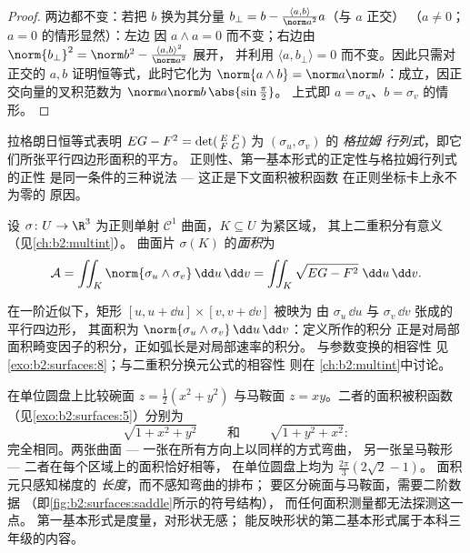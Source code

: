 \begin{proof}
两边都不变：若把 $b$ 换为其分量 $b_\perp
= b - \frac{\langle a, b\rangle}{\norm a^2}a$（与 $a$ 正交）
（$a \neq 0$；$a = 0$ 的情形显然）：左边
因 $a \wedge a = 0$ 而不变；右边由 $\norm
{b_\perp}^2 = \norm b^2 - \frac{\langle a,b\rangle^2}{\norm a^2}$ 展开，
并利用 $\langle a, b_\perp\rangle = 0$ 而不变。因此只需对正交的
$a, b$ 证明恒等式，此时它化为 $\norm{a \wedge
b} = \norm a \norm b$：成立，因正交向量的叉积范数为
$\norm a\norm b\,\abs{\sin\frac\pi2}$。
上式即 $a = \sigma_u$、$b = \sigma_v$ 的情形。
\end{proof}

\begin{remark}
拉格朗日恒等式表明 $EG - F^2 = \det\begin{psmallmatrix}
E & F\\ F & G\end{psmallmatrix}$ 为 $(\sigma_u, \sigma_v)$ 的 \emph{格拉姆
行列式}，即它们所张平行四边形面积的平方。
正则性、第一基本形式的正定性与格拉姆行列式的正性
是同一条件的三种说法 ---
这正是下文面积被积函数
在正则坐标卡上永不为零的
原因。
\end{remark}

\begin{definition}[面积]\label{def:b2:surfaces:area}
设 $\sigma \colon U \to \R^3$ 为正则单射
$\mathcal{C}^1$ 曲面，$K \subseteq U$ 为紧区域，
其上二重积分有意义（见\cref{ch:b2:multint}）。
曲面片 $\sigma(K)$ 的\emph{面积}为
\[
\mathcal{A}
= \iint_K \norm{\sigma_u \wedge \sigma_v}\,\dd u\,\dd v
= \iint_K \sqrt{EG - F^2}\;\dd u\,\dd v .
\]
\end{definition}

\begin{remark}[此公式的来由]
在一阶近似下，矩形 $[u, u + \dd u] \times [v, v + \dd v]$ 被映为
由 $\sigma_u\,\dd u$ 与 $\sigma_v\,\dd v$ 张成的平行四边形，
其面积为 $\norm{\sigma_u \wedge
\sigma_v}\,\dd u\,\dd v$：定义所作的积分
正是对局部面积畸变因子的积分，正如弧长是对局部速率的积分。
与参数变换的相容性
见\cref{exo:b2:surfaces:8}；与二重积分换元公式的相容性
则在
\cref{ch:b2:multint}中讨论。
\end{remark}

\begin{example}\label{ex:b2:surfaces:samearea}
在单位圆盘上比较碗面 $z = \frac12(x^2 + y^2)$
与马鞍面 $z = xy$。二者的面积被积函数
（见\cref{exo:b2:surfaces:5}）分别为
\[
\sqrt{1 + x^2 + y^2}
\qquad\text{ 和 }\qquad
\sqrt{1 + y^2 + x^2} :
\]
完全相同。两张曲面 --- 一张在所有方向上以同样的方式弯曲，
另一张呈马鞍形 --- 二者在每个区域上的面积恰好相等，
在单位圆盘上均为 $\frac{2\pi}3(2\sqrt2 - 1)$。
面积元只感知梯度的
\emph{长度}，而不感知弯曲的排布；
要区分碗面与马鞍面，需要二阶数据
（即\cref{fig:b2:surfaces:saddle}所示的符号结构），
而任何面积测量都无法探测这一点。
第一基本形式是度量，对形状无感；
能反映形状的第二基本形式属于本科三年级的内容。
\end{example}

